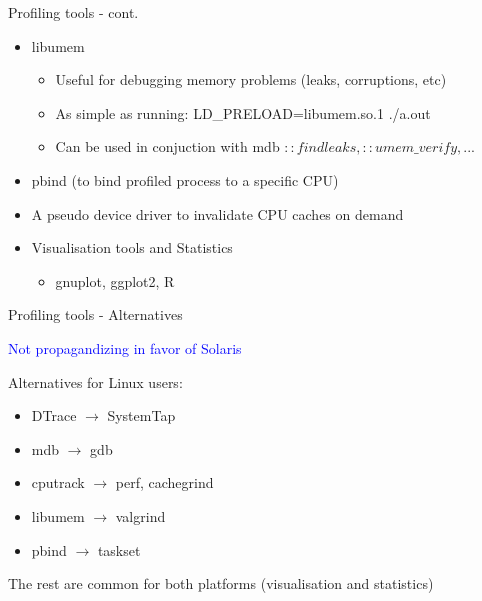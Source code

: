 \documentclass{beamer}
\begin{document}
\begin{frame}{Profiling tools - cont.}

\begin{itemize}
	\item libumem
	
	\begin{itemize}
		\item Useful for debugging memory problems (leaks, corruptions, etc)
		\item As simple as running: LD\_PRELOAD=libumem.so.1 ./a.out
		\item Can be used in conjuction with mdb \(::findleaks, ::umem\_verify, ...\)
	\end{itemize}
	
	\item pbind (to bind profiled process to a specific CPU)
	\item A pseudo device driver to invalidate CPU caches on demand
	\item Visualisation tools and Statistics
	
	\begin{itemize}
		\item gnuplot, ggplot2, R
	\end{itemize}
\end{itemize}
\end{frame}

\begin{frame}{Profiling tools - Alternatives}

\textcolor{blue}{Not propagandizing in favor of Solaris}

\vspace{5mm}

Alternatives for Linux users:

\begin{itemize}
	\item DTrace $\rightarrow$ SystemTap
	\item mdb $\rightarrow$ gdb
	\item cputrack $\rightarrow$ perf, cachegrind
	\item libumem $\rightarrow$ valgrind
	\item pbind $\rightarrow$ taskset
\end{itemize}

The rest are common for both platforms (visualisation and statistics)

\end{frame}
\end{document}
